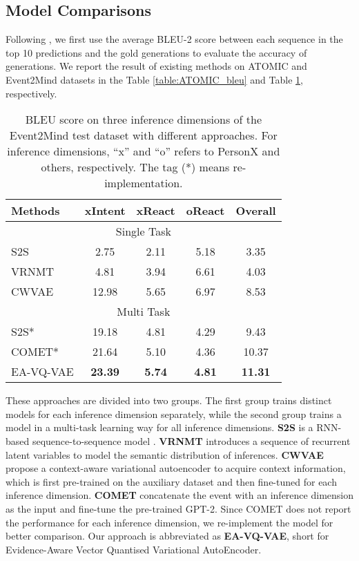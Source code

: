 \documentclass[11pt,a4paper]{article}
\begin{document}
\subsection{Model Comparisons}
Following \citet{sap2019atomic}, we first use the average BLEU-2 score between each sequence in the top 10 predictions and the gold generations to evaluate the accuracy of generations. We report the result of existing methods on ATOMIC and Event2Mind datasets in the Table \ref{table:ATOMIC_bleu} and Table \ref{table:Event2Mind_bleu}, respectively. 


\begin{table}[h]
	\begin{center}
		{\small
			\begin{tabular}{l|cccc} \hline 
Methods& xIntent & xReact & oReact &Overall\\
         		\hline
         		\hline
         		\multicolumn{5}{c}{Single Task} \\
         		\hline
         		\hline
				S2S & 2.75 &  2.11  & 5.18&3.35\\
				VRNMT& 4.81 &3.94&6.61&4.03 \\
				CWVAE & 12.98 &  5.65  & 6.97 & 8.53\\
         		\hline
         		\hline
         		\multicolumn{5}{c}{Multi Task} \\
         		\hline
         		\hline
				S2S* & 19.18 &  4.81  & 4.29&9.43\\
				COMET* & 21.64 &  5.10  & 4.36 & 10.37\\	
				EA-VQ-VAE& \bf{23.39} &  \bf{5.74}  & \bf{4.81}&\bf{11.31}\\	
				\hline
			\end{tabular}
		}
	\end{center}
	\caption{\label{table:Event2Mind_bleu} BLEU score on three inference dimensions of the Event2Mind test dataset with different approaches. For inference dimensions, ``x'' and ``o'' refers to PersonX and others, respectively. The tag (*) means re-implementation. }
	\vspace{-0.2cm}
\end{table}


These approaches are divided into two \mbox{groups}. The first group trains distinct models for each inference dimension separately, while the second group trains a model in a multi-task learning way for all inference dimensions. 
{\bf S2S} is a RNN-based  sequence-to-sequence model \cite{sutskever2014sequence}. 
{\bf VRNMT} \cite{su2018variational} introduces a sequence of recurrent latent variables to model the semantic distribution of inferences.
{\bf CWVAE} propose a context-aware variational autoencoder \cite{du2019modeling} to acquire context information, which is first pre-trained on the auxiliary dataset and then fine-tuned for each inference dimension. 
{\bf COMET} \cite{Bosselut2019COMETCT} concatenate the event with an inference dimension as the input and fine-tune the pre-trained GPT-2. Since COMET does not report the performance for each inference dimension, we re-implement the model for better comparison. Our approach is abbreviated as {\bf EA-VQ-VAE}, short for Evidence-Aware Vector Quantised Variational AutoEncoder.
\end{document}

